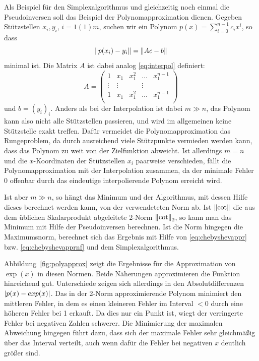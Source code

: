 Als Beispiel für den Simplexalgorithmus und gleichzeitig noch einmal
die Pseudoinversen soll das Beispiel der Polynomapproximation
dienen. Gegeben Stützstellen $x_i, y_i$, $i=1(1)m$, suchen wir ein
Polynom $p(x)=\sum_{i=0}^{n-1} c_ix^i$, so dass
\begin{equation}
  \left\lVert{p(x_i) - y_i}\right\rVert = \left\lVert{A c - b}\right\rVert
\end{equation}
minimal ist. Die Matrix $A$ ist dabei analog \eqref{eq:interpol} definiert:
\begin{equation}
  A=
  \begin{pmatrix}
    1 & x_1 & x_1^2 & \ldots & x_1^{n-1}\\
    \vdots & \vdots & & \vdots \\
    1 & x_1 & x_1^2 & \ldots & x_1^{n-1}\\
  \end{pmatrix}
\end{equation}
und $b=(y_i)_i$. Anders als bei der Interpolation ist dabei $m\gg n$,
das Polynom kann also nicht alle Stützstellen passieren, und wird im
allgemeinen keine Stützstelle exakt treffen. Dafür vermeidet die
Polynomapproximation das Rungeproblem, da durch ausreichend viele
Stützpunkte vermieden werden kann, dass das Polynom zu weit von der
Zielfunktion abweicht. Ist allerdings $m=n$ und die $x$-Koordinaten
der Stützstellen $x_i$ paarweise verschieden, fällt die
Polynomapproximation mit der Interpolation zusammen, da der minimale
Fehler $0$ offenbar durch das eindeutige interpolierende Polynom
erreicht wird.

Ist aber $m\gg n$, so hängt das Minimum und der Algorithmus, mit
dessen Hilfe dieses berechnet werden kann, von der verwendeteten Norm
ab. Ist $\left\lVert{\cot}\right\rVert$ die aus dem üblichen Skalarprodukt abgeleitete
2-Norm $\left\lVert{\cot}\right\rVert_2$, so kann man das Minimum mit Hilfe der
Pseudoinversen berechnen. Ist die Norm hingegen die Maximumsnorm,
berechnet sich das Ergebnis mit Hilfe von \eqref{eq:chebyshevappr}
bzw. \eqref{eq:chebyshevapprnf} und dem Simplexalgorithmus.

Abbildung~\ref{fig:polyapprox} zeigt die Ergebnisse für die
Approximation von $\exp(x)$ in diesen Normen. Beide Näherungen
approximieren die Funktion hinreichend gut. Unterschiede zeigen sich
allerdings in den Absolutdifferenzen $\left\lvert{p(x) - exp(x)}\right\rvert$. Das in der
2-Norm approximierende Polynom minimiert den mittleren Fehler, in dem
es einen kleineren Fehler im Interval $<0$ durch eine höheren Fehler
bei 1 erkauft. Da dies nur ein Punkt ist, wiegt der verringerte Fehler
bei negativen Zahlen schwerer. Die Minimierung der maximalen
Abweichung hingegen führt dazu, dass sich der maximale Fehler sehr
gleichmäßig über das Interval verteilt, auch wenn dafür die Fehler bei
negativen $x$ deutlich größer sind.

